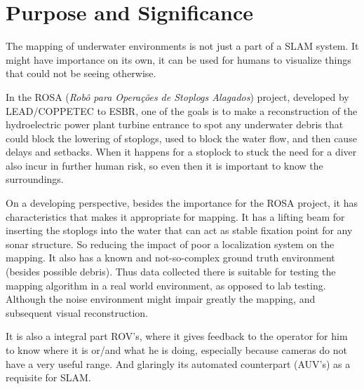 \section{Purpose and Significance}

The mapping of underwater environments is not just a part of a SLAM system. It
might have importance on its own, it can be used for humans to visualize things
that could not be seeing otherwise. 

In the ROSA (\textit{Robô para Operações de Stoplogs Alagados}) project,
developed by LEAD/COPPETEC to ESBR, one of the goals is to make a reconstruction
of the hydroelectric power plant turbine entrance to spot any underwater debris
that could block the lowering of stoplogs, used to block the water flow, and
then cause delays and setbacks. When it happens for a stoplock to stuck the need
for a diver also incur in further human risk, so even then it is important to
know the surroundings.

On a developing perspective, besides the importance for the ROSA project, it has
characteristics that makes it appropriate for mapping. It has a lifting beam for
inserting the stoplogs into the water that can act as stable fixation point for
any sonar structure. So reducing the impact of poor a localization system on the
mapping. It also has a known and not-so-complex ground truth environment
(besides possible debris). Thus data collected there is suitable for testing the mapping
algorithm in a real world environment, as opposed to lab testing.
Although the noise environment might impair greatly the mapping, and subsequent
visual reconstruction.


It is also a integral part ROV's, where it gives feedback to the operator for
him to know where it is or/and what he is doing, especially because cameras do
not have a very useful range. And glaringly its automated counterpart (AUV's) as
a requisite for SLAM.